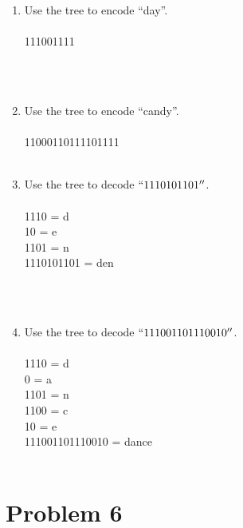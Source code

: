 \documentclass{amsart}
\theoremstyle{definition}
\theoremstyle{Exercise}
\theoremstyle{remark}
\theoremstyle{rule}
\numberwithin{equation}{section}
\begin{document}
\begin{enumerate}[label=(\alph*)]
\item Use the tree to encode ``day''.\\\\
111001111

\\\\
\item Use the tree to encode ``candy''.\\\\
11000110111101111
\\\\
\item Use the tree to decode $``1110101101''$.\\\\
1110 = d\\
10 = e\\
1101 = n\\
1110101101 = den

\\\\
\item Use the tree to decode $``111001101110010''$.\\\\
1110 = d\\
0 = a\\
1101 = n\\
1100 = c\\
10 = e\\
111001101110010 = dance
\\\\

\end{enumerate}

 \newpage

\section*{Problem 6}
\end{document}
